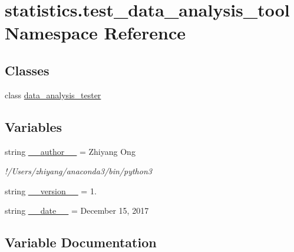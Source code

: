 \hypertarget{namespacestatistics_1_1test__data__analysis__tool}{}\section{statistics.\+test\+\_\+data\+\_\+analysis\+\_\+tool Namespace Reference}
\label{namespacestatistics_1_1test__data__analysis__tool}
\subsection*{Classes}
\begin{DoxyCompactItemize}
\item 
class \hyperlink{classstatistics_1_1test__data__analysis__tool_1_1data__analysis__tester}{data\+\_\+analysis\+\_\+tester}
\end{DoxyCompactItemize}
\subsection*{Variables}
\begin{DoxyCompactItemize}
\item 
string \hyperlink{namespacestatistics_1_1test__data__analysis__tool_a980d8dc33d59285196b930ec7ddabdc8}{\+\_\+\+\_\+author\+\_\+\+\_\+} = \textquotesingle{}Zhiyang Ong\textquotesingle{}
\begin{DoxyCompactList}\small\item\em !/\+Users/zhiyang/anaconda3/bin/python3 \end{DoxyCompactList}\item 
string \hyperlink{namespacestatistics_1_1test__data__analysis__tool_a3299e44231fc0bc029f4c6d86924b125}{\+\_\+\+\_\+version\+\_\+\+\_\+} = \textquotesingle{}1.\textquotesingle{}
\item 
string \hyperlink{namespacestatistics_1_1test__data__analysis__tool_a15ce2cfbc6ba4e95b94a79c18678373f}{\+\_\+\+\_\+date\+\_\+\+\_\+} = \textquotesingle{}December 15, 2017\textquotesingle{}
\end{DoxyCompactItemize}


\subsection{Variable Documentation}
\hypertarget{namespacestatistics_1_1test__data__analysis__tool_a980d8dc33d59285196b930ec7ddabdc8}{}
